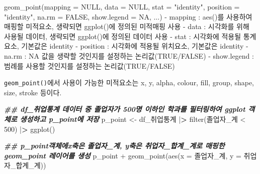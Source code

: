\documentclass[
]{article}
\newenvironment{Shaded}{\begin{snugshade}}{\end{snugshade}}
\newcommand{\AttributeTok}[1]{\textcolor[rgb]{0.77,0.63,0.00}{#1}}
\newcommand{\ConstantTok}[1]{\textcolor[rgb]{0.00,0.00,0.00}{#1}}
\newcommand{\DecValTok}[1]{\textcolor[rgb]{0.00,0.00,0.81}{#1}}
\newcommand{\DocumentationTok}[1]{\textcolor[rgb]{0.56,0.35,0.01}{\textbf{\textit{#1}}}}
\newcommand{\ErrorTok}[1]{\textcolor[rgb]{0.64,0.00,0.00}{\textbf{#1}}}
\newcommand{\FunctionTok}[1]{\textcolor[rgb]{0.00,0.00,0.00}{#1}}
\newcommand{\NormalTok}[1]{#1}
\newcommand{\OtherTok}[1]{\textcolor[rgb]{0.56,0.35,0.01}{#1}}
\newcommand{\SpecialCharTok}[1]{\textcolor[rgb]{0.00,0.00,0.00}{#1}}
\newcommand{\StringTok}[1]{\textcolor[rgb]{0.31,0.60,0.02}{#1}}
\begin{document}
\begin{Shaded}
\begin{Highlighting}[]
\FunctionTok{geom\_point}\NormalTok{(}\AttributeTok{mapping =} \ConstantTok{NULL}\NormalTok{, }\AttributeTok{data =} \ConstantTok{NULL}\NormalTok{,  }\AttributeTok{stat =} \StringTok{"identity"}\NormalTok{,  }\AttributeTok{position =} \StringTok{"identity"}\NormalTok{, }\AttributeTok{na.rm =} \ConstantTok{FALSE}\NormalTok{, }\AttributeTok{show.legend =} \ConstantTok{NA}\NormalTok{,  ...)}
  \SpecialCharTok{{-}}\NormalTok{ mapping }\SpecialCharTok{:} \FunctionTok{aes}\NormalTok{()를 사용하여 매핑할 미적요소, 생략되면 }\FunctionTok{ggplot}\NormalTok{()에 정의된 미적매핑 사용}
  \SpecialCharTok{{-}}\NormalTok{ data }\SpecialCharTok{:}\NormalTok{ 시각화를 위해 사용될 데이터, 생략되면 }\FunctionTok{ggplot}\NormalTok{()에 정의된 데이터 사용}
  \SpecialCharTok{{-}}\NormalTok{ stat }\SpecialCharTok{:}\NormalTok{ 시각화에 적용될 통계요소, 기본값은 }\StringTok{\textquotesingle{}identity\textquotesingle{}}
  \SpecialCharTok{{-}}\NormalTok{ position }\SpecialCharTok{:}\NormalTok{ 시각화에 적용될 위치요소, 기본값은 }\StringTok{\textquotesingle{}identity\textquotesingle{}}
  \SpecialCharTok{{-}}\NormalTok{ na.rm }\SpecialCharTok{:} \ConstantTok{NA}\NormalTok{ 값을 생략할 것인지를 설정하는 논리값(}\ConstantTok{TRUE}\SpecialCharTok{/}\ConstantTok{FALSE}\NormalTok{)}
  \SpecialCharTok{{-}}\NormalTok{ show.legend }\SpecialCharTok{:}\NormalTok{ 범례를 사용할 것인지를 설정하는 논리값(}\ConstantTok{TRUE}\SpecialCharTok{/}\ConstantTok{FALSE}\NormalTok{) }
\end{Highlighting}
\end{Shaded}

\texttt{geom\_point()}에서 사용이 가능한 미적요소는 x, y, alpha, colour, fill, group, shape, size, stroke 등이다.

\begin{Shaded}
\begin{Highlighting}[]
\DocumentationTok{\#\#  df\_취업통계 데이터 중 졸업자가 500명 이하인 학과를 필터링하여 ggplot 객체로 생성하고 p\_point에 저장}
\NormalTok{p\_point }\OtherTok{\textless{}{-}}\NormalTok{ df\_취업통계 }\SpecialCharTok{|}\ErrorTok{\textgreater{}} \FunctionTok{filter}\NormalTok{(졸업자\_계 }\SpecialCharTok{\textless{}} \DecValTok{500}\NormalTok{) }\SpecialCharTok{|}\ErrorTok{\textgreater{}}
  \FunctionTok{ggplot}\NormalTok{()}

\DocumentationTok{\#\#  p\_point객체에x축은 졸업자\_계, y축은 취업자\_합계\_계로 매핑한  geom\_point 레이어를 생성}
\NormalTok{p\_point }\SpecialCharTok{+}
  \FunctionTok{geom\_point}\NormalTok{(}\FunctionTok{aes}\NormalTok{(}\AttributeTok{x =}\NormalTok{ 졸업자\_계, }\AttributeTok{y =}\NormalTok{ 취업자\_합계\_계))}
\end{Highlighting}
\end{Shaded}
\end{document}
